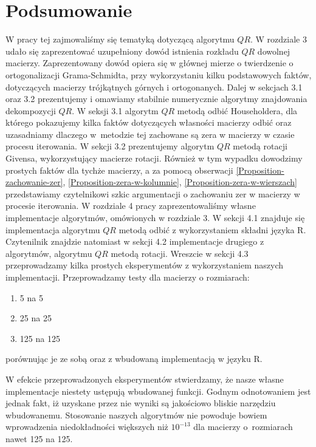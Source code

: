 \documentclass[12pt,a4paper]{report}
\newcommand{\mx}[1]{{#1}}
\begin{document}
\chapter{Podsumowanie}

W pracy tej zajmowaliśmy się tematyką dotyczącą algorytmu $\mx{QR}$. W rozdziale 3 udało się zaprezentować uzupełniony dowód istnienia rozkładu $\mx{QR}$ dowolnej macierzy. Zaprezentowany dowód opiera się w głównej mierze o twierdzenie o ortogonalizacji Grama-Schmidta, przy wykorzystaniu kilku podstawowych faktów, dotyczących macierzy trójkątnych górnych i ortogonanych. Dalej w sekcjach 3.1 oraz 3.2 prezentujemy i omawiamy stabilnie numerycznie algorytmy znajdowania dekompozycji $\mx{QR}$. W seksji 3.1 algorytm $\mx{QR}$ metodą odbić Householdera, dla którego pokazujemy kilka faktów dotyczących własności macierzy odbić oraz uzasadniamy dlaczego w~metodzie tej zachowane są  zera w macierzy w czasie procesu iterowania. W sekcji 3.2 prezentujemy algorytm $\mx{QR}$ metodą rotacji Givensa, wykorzystujący macierze rotacji. Również w tym wypadku dowodzimy prostych faktów dla tychże macierzy, a za pomocą obserwacji \ref{Proposition-zachowanie-zer}, \ref{Proposition-zera-w-kolumnie}, \ref{Proposition-zera-w-wierszach}  przedstawiamy czytelnikowi szkic argumentacji o zachowaniu zer w macierzy w procesie iterowania. W rozdziale 4 pracy zaprezentowaliśmy własne implementacje algorytmów, omówionych w rozdziale 3. W sekcji 4.1 znajduje się implementacja algorytmu $\mx{QR}$ metodą odbić z wykorzystaniem składni języka R. Czytenilnik znajdzie natomiast w sekcji 4.2 implementacje drugiego z algorytmów, algorytmu $\mx{QR}$ metodą rotacji. Wreszcie w sekcji 4.3 przeprowadzamy kilka prostych eksperymentów z wykorzystaniem naszych implementacji. Przeprowadzamy testy dla macierzy o rozmiarach:
\begin{enumerate}
\item 5 na 5
\item 25 na 25
\item 125 na 125
\end{enumerate}
porównując je ze sobą oraz z wbudowaną implementacją w języku R.


W efekcie przeprowadzonych eksperymentów stwierdzamy, że nasze własne implementacje niestety ustępują wbudowanej funkcji. Godnym odnotowaniem jest jednak fakt, iż uzyskane przez nie wyniki są jakościowo bliskie narzędziu wbudowanemu. Stosowanie naszych algorytmów nie powoduje bowiem wprowadzenia niedokładności większych niż $10^{-13}$ dla macierzy o~rozmiarach nawet 125 na 125.






\end{document}
